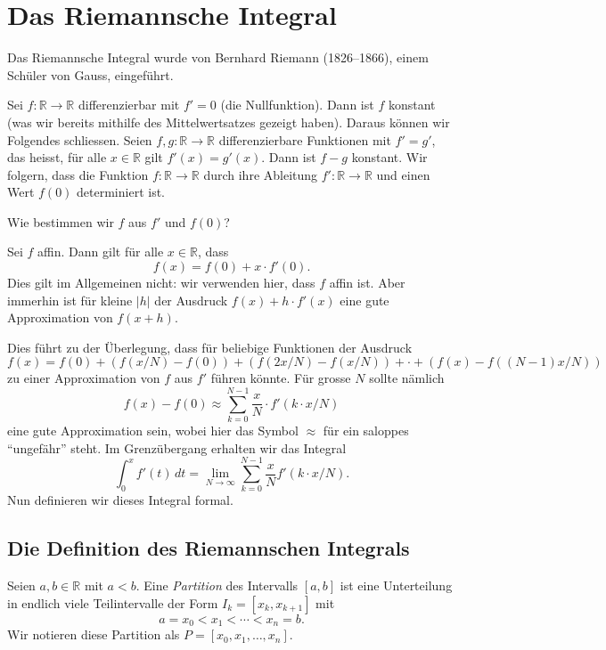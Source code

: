 \documentclass[../main.tex]{subfiles}
\begin{document}
\chapter{Das Riemannsche Integral}
Das Riemannsche Integral wurde
von Bernhard Riemann (1826--1866), einem Schüler von Gauss, eingeführt. %

Sei $f \colon \mathbb{R} \to \mathbb{R}$ differenzierbar
mit $f' = 0$ (die Nullfunktion).
Dann ist $f$ konstant (was wir bereits mithilfe des
Mittelwertsatzes gezeigt haben). Daraus können wir
Folgendes schliessen.
Seien $f, g \colon \mathbb{R} \to \mathbb{R}$
differenzierbare
Funktionen mit
$f' = g'$, das heisst, für alle $x \in \mathbb{R}$
gilt $f'(x) = g'(x)$.
Dann ist $f - g$ konstant.
Wir folgern, dass die Funktion $f \colon \mathbb{R} \to \mathbb{R}$
durch ihre Ableitung $f' \colon \mathbb{R} \to \mathbb{R}$
und einen Wert $f(0)$ determiniert ist.

\begin{question}
  Wie bestimmen wir $f$ aus $f'$
  und $f(0)$?
\end{question}

\begin{specialcase}
  Sei $f$ affin. Dann gilt für alle
  $x \in \mathbb{R}$, dass
  \[
    f(x) = f(0) + x \cdot f'(0).
  \]
  Dies gilt im Allgemeinen nicht: wir verwenden
  hier, dass $f$ affin ist.
  Aber immerhin ist für kleine $|h|$
  der Ausdruck $f(x) + h \cdot f'(x)$ eine
  gute Approximation von $f(x + h)$.
\end{specialcase}

Dies führt zu der Überlegung, dass für beliebige
Funktionen der Ausdruck
\[
  f(x) = f(0) + (f(x/N) - f(0))
  + (f(2x/N) - f(x/N)) + \cdot
  + (f(x) - f((N-1)x/N))
\]
zu einer Approximation von $f$ aus
$f'$ führen könnte. Für grosse $N$
sollte nämlich
\[
  f(x) - f(0) \approx \sum_{k = 0}^{N - 1}
  \frac{x}{N} \cdot f'(k \cdot x / N)
\]
eine gute Approximation sein, wobei
hier das Symbol $\approx$ für ein
saloppes ``ungefähr'' steht.
Im Grenzübergang erhalten wir das
Integral
\[
  \int_{0}^{x} f'(t) \, dt =
  \lim_{N \to \infty} \sum_{k = 0}^{N - 1} \frac{x}{N}
  f'(k \cdot x/N).
\]
Nun definieren wir dieses Integral formal.

\section{Die Definition des Riemannschen Integrals}\label{sec:riemann-definition}
\begin{definition}
  Seien $a,b \in \mathbb{R}$
  mit $a < b$. Eine \emph{Partition} des Intervalls
  $[a, b]$ ist eine Unterteilung in
  endlich viele Teilintervalle der
  Form
  $I_k = [x_k, x_{k  + 1}]$ mit
  \[
    a = x_0 < x_1 < \cdots < x_n = b.
  \]
  Wir notieren diese Partition als
  $P = [x_0, x_1, \dots, x_n]$.
\end{definition}
\end{document}
